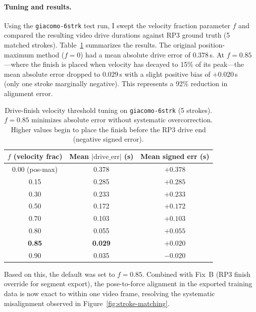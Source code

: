 \documentclass[11pt]{article}
\begin{document}
\paragraph{Tuning and results.}
Using the \texttt{giacomo-6strk} test run, I swept the velocity fraction parameter $f$ and compared the resulting video drive durations against RP3 ground truth (5 matched strokes). Table~\ref{tab:velocity-tuning} summarizes the results. The original position-maximum method ($f = 0$) had a mean absolute drive error of $0.378$\,s. At $f = 0.85$---where the finish is placed when velocity has decayed to 15\% of its peak---the mean absolute error dropped to $0.029$\,s with a slight positive bias of $+0.020$\,s (only one stroke marginally negative). This represents a 92\% reduction in alignment error.

\begin{table}[H]
	\centering
	\begin{tabular}{ccc}
		\hline
		$f$ (velocity frac) & Mean $|\mathrm{drive\_err}|$ (s) & Mean signed err (s) \\
		\hline
		0.00 (pos-max)      & 0.378                            & $+0.378$            \\
		0.15                & 0.285                            & $+0.285$            \\
		0.30                & 0.233                            & $+0.233$            \\
		0.50                & 0.172                            & $+0.172$            \\
		0.70                & 0.103                            & $+0.103$            \\
		0.80                & 0.055                            & $+0.055$            \\
		\textbf{0.85}       & \textbf{0.029}                   & $\mathbf{+0.020}$   \\
		0.90                & 0.035                            & $-0.020$            \\
		\hline
	\end{tabular}
	\caption{Drive-finish velocity threshold tuning on \texttt{giacomo-6strk} (5 strokes). $f = 0.85$ minimizes absolute error without systematic overcorrection. Higher values begin to place the finish before the RP3 drive end (negative signed error).}
	\label{tab:velocity-tuning}
\end{table}

Based on this, the default was set to $f = 0.85$. Combined with Fix~B (RP3 finish override for segment export), the pose-to-force alignment in the exported training data is now exact to within one video frame, resolving the systematic misalignment observed in Figure~\ref{fig:stroke-matching}.
\end{document}
